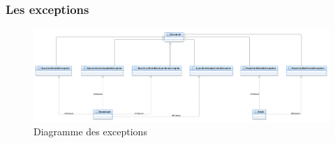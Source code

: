 \subsubsection{Les exceptions}

\begin{figure}[h]
	\centering
	\includegraphics[width=\textwidth]{ttmc_exception.png}
	\caption{Diagramme des exceptions}
	\label{fig:diag_exception}
\end{figure}

